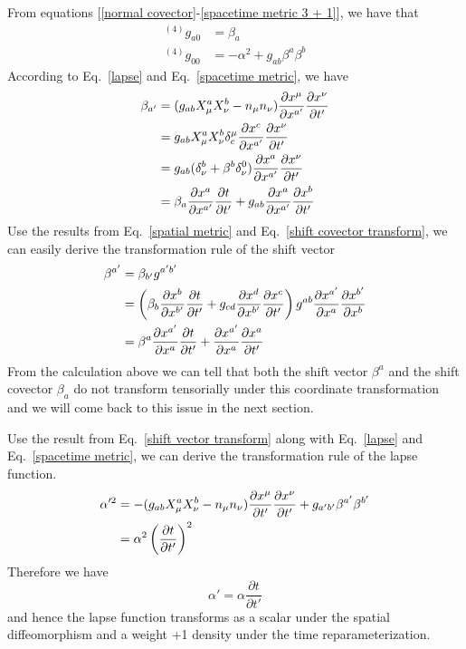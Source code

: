 \documentclass[letterpaper,nofootinbib,prd,amsmath,onecolumn]{revtex4-1}
\begin{document}
From equations [\ref{normal covector}-\ref{spacetime metric 3 + 1}], we have that
\begin{align}
^{(4)}g_{a0} & = \beta_{a}\label{lapse}\\
^{(4)}g_{00} & = -\alpha^2 + g_{ab}\beta^{a}\beta^{b}\label{shift}
\end{align}
According to Eq.~\ref{lapse} and Eq.~\ref{spacetime metric}, we have
\begin{align}
\beta_{a'} & = (g_{ab}X^{a}_{\mu}X^{b}_{\nu} - n_{\mu}n_{\nu})\frac{\partial x^{\mu}}{\partial x^{a'}}\frac{\partial x^{\nu}}{\partial t'}\notag\\
& = g_{ab}X^{a}_{\mu}X^{b}_{\nu}\delta_{c}^{\mu}\frac{\partial x^{c}}{\partial x^{a'}}\frac{\partial x^{\nu}}{\partial t'}\notag\\
& = g_{ab}(\delta^{b}_{\nu} + \beta^{b}\delta^{0}_{\nu})\frac{\partial x^{a}}{\partial x^{a'}}\frac{\partial x^{\nu}}{\partial t'}\notag\\
& = \beta_{a}\frac{\partial x^{a}}{\partial x^{a'}}\frac{\partial t}{\partial t'} + g_{ab}\frac{\partial x^{a}}{\partial x^{a'}}\frac{\partial x^{b}}{\partial t'}\label{shift covector transform}
\end{align}
Use the results from Eq.~\ref{spatial metric} and Eq.~\ref{shift covector transform}, we can easily derive the transformation rule of the shift vector
\begin{align}
\beta^{a'} & = \beta_{b'}g^{a'b'}\notag\\
& = \left(\beta_{b}\frac{\partial x^{b}}{\partial x^{b'}}\frac{\partial t}{\partial t'} + g_{cd}\frac{\partial x^{d}}{\partial x^{b'}}\frac{\partial x^{c}}{\partial t'}\right)g^{ab}\frac{\partial x^{a'}}{\partial x^{a}}\frac{\partial x^{b'}}{\partial x^{b}}\notag\\
& = \beta^{a}\frac{\partial x^{a'}}{\partial x^{a}}\frac{\partial t}{\partial t'} + \frac{\partial x^{a'}}{\partial x^{a}}\frac{\partial x^{a}}{\partial t'}\label{shift vector transform}
\end{align}
From the calculation above we can tell that both the shift vector $\beta^{a}$ and the shift covector $\beta_{a}$ do not transform tensorially under this coordinate transformation and we will come back to this issue in the next section. 

Use the result from Eq.~\ref{shift vector transform} along with Eq.~\ref{lapse} and Eq.~\ref{spacetime metric}, we can derive the transformation rule of the lapse function. 
\begin{align*}
\alpha'^{2} & = - (g_{ab}X^{a}_{\mu}X^{b}_{\nu} - n_{\mu}n_{\nu})\frac{\partial x^{\mu}}{\partial t'}\frac{\partial x^{\nu}}{\partial t'} + g_{a'b'}\beta^{a'}\beta^{b'}\notag\\ 
& = \alpha^2\left(\frac{\partial t}{\partial t'}\right)^{2}
\end{align*}
Therefore we have
\begin{equation}
\alpha' = \alpha\frac{\partial t}{\partial t'}\label{lapse transform}
\end{equation}
and hence the lapse function transforms as a scalar under the spatial diffeomorphism and a weight +1 density under the time reparameterization. 
 
\end{document}
